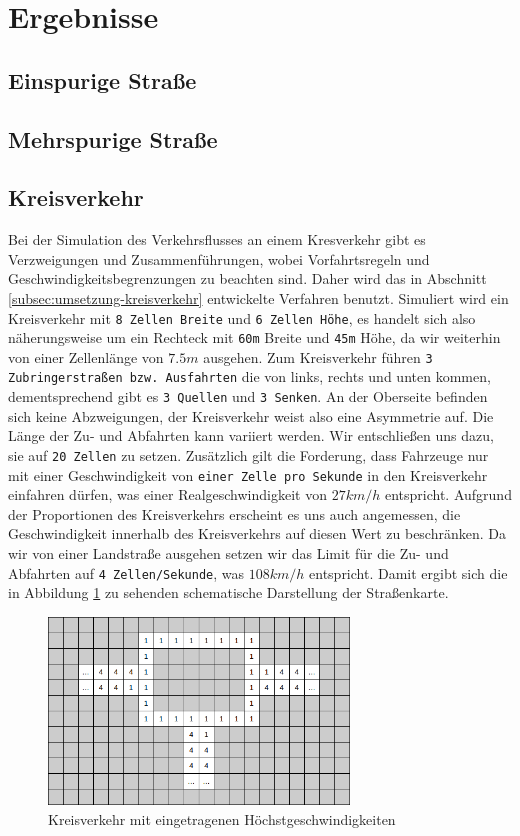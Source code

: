 \documentclass[11pt, a4paper]{article}
\begin{document}
\newpage
\section{Ergebnisse}
\label{sec:ergebnisse}
\subsection{Einspurige Straße}
\subsection{Mehrspurige Straße}
\subsection{Kreisverkehr}
Bei der Simulation des Verkehrsflusses an einem Kresverkehr gibt es Verzweigungen und Zusammenführungen, wobei Vorfahrtsregeln und Geschwindigkeitsbegrenzungen zu beachten sind. Daher wird das in Abschnitt \ref{subsec:umsetzung-kreisverkehr} entwickelte Verfahren benutzt. Simuliert wird ein Kreisverkehr mit \texttt{8 Zellen Breite} und \texttt{6 Zellen Höhe}, es handelt sich also näherungsweise um ein Rechteck mit \texttt{60m} Breite und \texttt{45m} Höhe, da wir weiterhin von einer Zellenlänge von $7.5m$ ausgehen. Zum Kreisverkehr führen \texttt{3 Zubringerstraßen bzw. Ausfahrten} die von links, rechts und unten kommen, dementsprechend gibt es \texttt{3 Quellen} und \texttt{3 Senken}. An der Oberseite befinden sich keine Abzweigungen, der Kreisverkehr weist also eine Asymmetrie auf. Die Länge der Zu- und Abfahrten kann variiert werden. Wir entschließen uns dazu, sie auf \texttt{20 Zellen} zu setzen. Zusätzlich gilt die Forderung, dass Fahrzeuge nur mit einer Geschwindigkeit von \texttt{einer Zelle pro Sekunde} in den Kreisverkehr einfahren dürfen, was einer Realgeschwindigkeit von $27km/h$ entspricht. Aufgrund der Proportionen des Kreisverkehrs erscheint es uns auch angemessen, die Geschwindigkeit innerhalb des Kreisverkehrs auf diesen Wert zu beschränken. Da wir von einer Landstraße ausgehen setzen wir das Limit für die Zu- und Abfahrten auf \texttt{4 Zellen/Sekunde}, was $108km/h$ entspricht. Damit ergibt sich die in Abbildung \ref{fig:roundaboutSmall} zu sehenden schematische Darstellung der Straßenkarte.

\begin{figure}[h!]
	\centering
	\includegraphics[width=8cm]{img/roundaboutSmall}
	\caption{Kreisverkehr mit eingetragenen Höchstgeschwindigkeiten}
	\label{fig:roundaboutSmall}
\end{figure}
\end{document}
